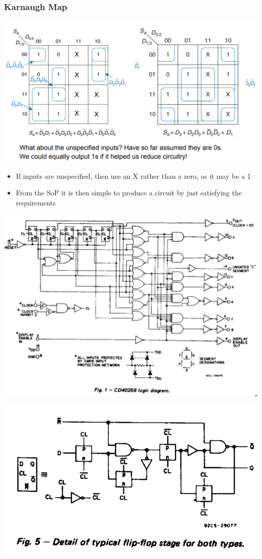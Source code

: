\documentclass{article}[18pt]
\begin{document}
\subsubsection{Karnaugh Map}
\begin{center}
	\includegraphics[scale=0.5]{7se_Karnaugh1}
\end{center}
\begin{itemize}
	\item If inputs are unspecified, then use an X rather than a zero, as it may be a 1
	\item From the SoP it is then simple to produce a circuit by just satisfying the requirements
\end{itemize}


\begin{center}
	\includegraphics[scale=0.7]{circuit1}
\end{center}
\begin{center}
	\includegraphics[scale=0.5]{circuit2}
\end{center}
\end{document}
